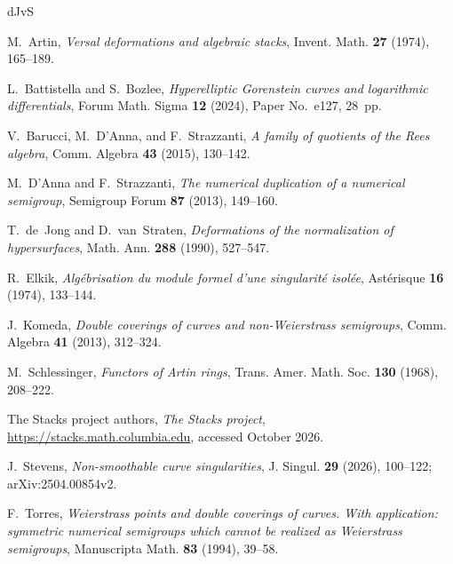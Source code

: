 \documentclass{amsart}
\theoremstyle{definition}
\theoremstyle{remark}
\numberwithin{equation}{section}
\begin{document}
\begin{thebibliography}{dJvS}

M.~Artin, \emph{Versal deformations and algebraic stacks}, Invent. Math. \textbf{27} (1974), 165--189.

L.~Battistella and S.~Bozlee, \emph{Hyperelliptic Gorenstein curves and logarithmic differentials}, Forum Math. Sigma \textbf{12} (2024), Paper No.~e127, 28~pp.

V.~Barucci, M.~D'Anna, and F.~Strazzanti, \emph{A family of quotients of the Rees algebra}, Comm. Algebra \textbf{43} (2015), 130--142.

M.~D'Anna and F.~Strazzanti, \emph{The numerical duplication of a numerical semigroup}, Semigroup Forum \textbf{87} (2013), 149--160.

T.~de~Jong and D.~van~Straten, \emph{Deformations of the normalization of hypersurfaces}, Math. Ann. \textbf{288} (1990), 527--547.

R.~Elkik, \emph{Alg\'ebrisation du module formel d'une singularit\'e isol\'ee}, Ast\'erisque \textbf{16} (1974), 133--144.

J.~Komeda, \emph{Double coverings of curves and non-Weierstrass semigroups}, Comm. Algebra \textbf{41} (2013), 312--324.

M.~Schlessinger, \emph{Functors of Artin rings}, Trans. Amer. Math. Soc. \textbf{130} (1968), 208--222.

The Stacks project authors, \emph{The Stacks project}, \url{https://stacks.math.columbia.edu}, accessed October 2026.

J.~Stevens, \emph{Non-smoothable curve singularities}, J. Singul. \textbf{29} (2026), 100--122; arXiv:2504.00854v2.

F.~Torres, \emph{Weierstrass points and double coverings of curves. With application: symmetric numerical semigroups which cannot be realized as Weierstrass semigroups}, Manuscripta Math. \textbf{83} (1994), 39--58.

\end{thebibliography}
\end{document}
